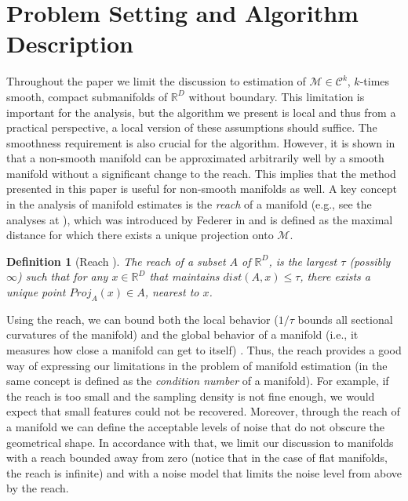 \documentclass[12pt]{article}
\newtheorem{definition}{Definition}
\theoremstyle{remark}
\newcommand{\RR}{\mathbb{R}}
\newcommand{\MM}{\mathcal{M}}
\newcommand{\C}{\mathcal{C}}
\begin{document}
\section{Problem Setting and Algorithm Description}
\label{sec:Problem_Setting}
Throughout the paper we limit the discussion to estimation of $\MM\in\C^k$, $k$-times smooth, compact submanifolds of $\RR^D$ without boundary.
This limitation is important for the analysis, but the algorithm we present is local and thus from a practical perspective, a local version of these assumptions should suffice. The smoothness requirement is also crucial for the algorithm. However, it is shown in \cite{kouvrimska2024free} that a non-smooth manifold can be approximated arbitrarily well by a smooth manifold without a significant change to the reach. This implies that the method presented in this paper is useful for non-smooth manifolds as well.
A key concept in the analysis of manifold estimates is the \textit{reach} of a manifold (e.g., see the analyses at \cite{aamari2018stability,aamari2019nonasymptotic,fefferman2018fitting,niyogi2008finding}), which was introduced by Federer in \cite{federer1959curvature} and is defined as the maximal distance for which there exists a unique projection onto $\MM$.
\begin{definition}[Reach \cite{federer1959curvature}]\label{def:reach}
	The reach of a subset $A$ of $\RR^D$, is the largest $\tau$ \emph{(}possibly $\infty$\emph{)} such that for any $x\in\RR^D$ that maintains $dist(A,x)\leq \tau$, there exists a unique point $Proj_A(x)\in A$, nearest to $x$. 
\end{definition}
Using the reach, we can bound both the local behavior ($1/\tau$ bounds all sectional curvatures of the manifold) and the global behavior of a manifold (i.e., it measures how close a manifold can get to itself) \cite{boissonnat2017reach}. 
Thus, the reach provides a good way of expressing our limitations in the problem of manifold estimation (in \cite{niyogi2008finding} the same concept is defined as the \textit{condition number} of a manifold).
For example, if the reach is too small and the sampling density is not fine enough, we would expect that small features could not be recovered.
Moreover, through the reach of a manifold we can define the acceptable levels of noise that do not obscure the geometrical shape.
In accordance with that, we limit our discussion to manifolds with a reach bounded away from zero (notice that in the case of flat manifolds, the reach is infinite) and with a noise model that limits the noise level from above by the reach.
\end{document}
